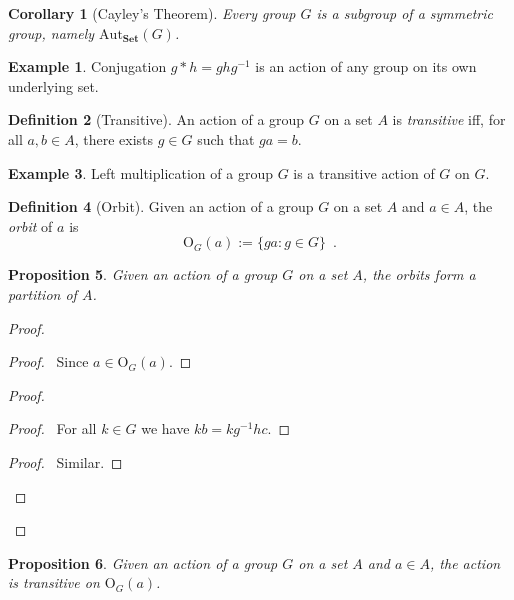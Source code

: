 \documentclass{book}
\let\qed\relax
\newtheorem{prop}{Proposition}[chapter]
\newtheorem{cor}{Corollary}[prop]
\theoremstyle{definition}
\newtheorem{df}[prop]{Definition}
\newtheorem{ex}[prop]{Example}
\newcommand{\Aut}[2]{\ensuremath{\mathrm{Aut}_{#1} \left( {#2} \right)}}
\newcommand{\inv}[1]{\ensuremath{{#1}^{-1}}}
\newcommand{\Set}{\ensuremath{\mathbf{Set}}}
\begin{document}
\begin{cor}[Cayley's Theorem]
Every group $G$ is a subgroup of a symmetric group, namely $\Aut{\Set}{G}$.
\end{cor}

\begin{ex}
Conjugation $g * h = gh\inv{g}$ is an action of any group on its own underlying set.
\end{ex}

\begin{df}[Transitive]
An action of a group $G$ on a set $A$ is \emph{transitive} iff, for all $a,b \in A$, there exists $g \in G$ such that $ga = b$.
\end{df}

\begin{ex}
Left multiplication of a group $G$ is a transitive action of $G$ on $G$.
\end{ex}

\begin{df}[Orbit]
Given an action of a group $G$ on a set $A$ and $a \in A$, the \emph{orbit} of $a$ is
\[ \mathrm{O}_G(a) := \{ ga : g \in G \} \enspace . \]
\end{df}

\begin{prop}
Given an action of a group $G$ on a set $A$, the orbits form a partition of $A$.
\end{prop}

\begin{proof}
\pf
{}
\begin{proof}
\pf\ Since $a \in \mathrm{O}_G(a)$.
\end{proof}
\begin{proof}
\begin{proof}
\pf\ For all $k \in G$ we have $kb = k\inv{g}hc$.
\end{proof}
\begin{proof}
\pf\ Similar.
\end{proof}
\end{proof}
\qed
\end{proof}

\begin{prop}
Given an action of a group $G$ on a set $A$ and $a \in A$, the action is transitive on $\mathrm{O}_G(a)$.
\end{prop}
\end{document}
